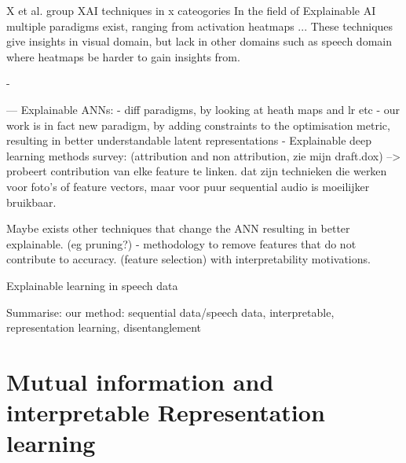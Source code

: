 	
	
	X et al. group XAI techniques in x cateogories
		In the field of Explainable AI multiple paradigms exist, ranging from activation heatmaps ...
	These techniques give insights in visual domain, but lack in other domains such as speech domain where heatmaps be harder to gain insights from.
	
		
	
	- 

---
Explainable ANNs:
	- diff paradigms, by looking at heath maps and lr etc
	- our work is in fact new paradigm, by adding constraints to the optimisation metric, resulting in better understandable latent representations
	- Explainable deep learning methods survey: \cite{baiExplainableDeepLearning2021} (attribution and non attribution, zie mijn draft.dox) --> probeert contribution van elke feature te linken. dat zijn technieken die werken voor foto's of feature vectors, maar voor puur sequential audio is moeilijker bruikbaar.
	
	Maybe exists other techniques that change the ANN resulting in better explainable. (eg pruning?)
	- methodology to remove features that do not contribute to accuracy. (feature selection) with interpretability motivations. \cite{glorfeldMethodologySimplificationInterpretation1996}
	
	
Explainable learning in speech data


Summarise: our method: sequential data/speech data, interpretable, representation learning, disentanglement

\section{Mutual information and interpretable Representation learning}

